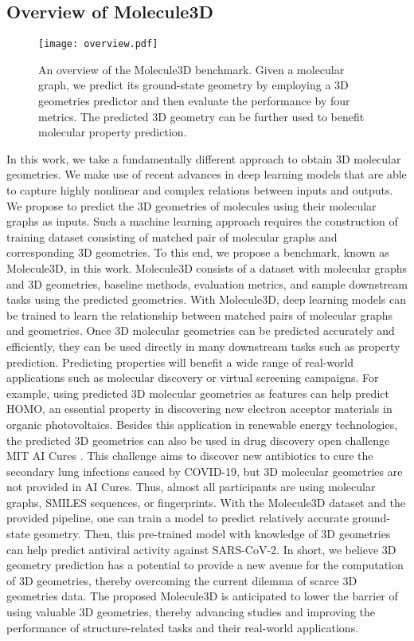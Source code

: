 \documentclass{article}
\begin{document}
\subsection{Overview of Molecule3D}

\begin{figure}
    \centering
    \texttt{[image: overview.pdf]}
    \caption{An overview of the Molecule3D benchmark. Given a molecular graph, we predict its ground-state geometry by employing a 3D geometries predictor and then evaluate the performance by four metrics. The predicted 3D geometry can be further used to benefit molecular property prediction.}
    \label{fig:overview}
\end{figure}

In this work, we take a fundamentally different approach to obtain 3D molecular geometries. We make use of recent advances in deep learning models that are able to capture highly nonlinear and complex relations between inputs and outputs. We propose to predict the 3D geometries of molecules using their molecular graphs as inputs. Such a machine learning approach requires the construction of training dataset consisting of matched pair of molecular graphs and corresponding 3D geometries. To this end, we propose a benchmark, known as Molecule3D, in this work. Molecule3D consists of a dataset with molecular graphs and 3D geometries, baseline methods, evaluation metrics, and sample downstream tasks using the predicted geometries. With Molecule3D, deep learning models can be trained to learn the relationship between matched pairs of molecular graphs and geometries. Once 3D molecular geometries can be predicted accurately and efficiently, they can be used directly in many downstream tasks such as property prediction. Predicting properties will benefit a wide range of real-world applications such as molecular discovery or virtual screening campaigns. For example, using predicted 3D molecular geometries as features can help predict HOMO, an essential property in discovering new electron acceptor materials in organic photovoltaics. Besides this application in renewable energy technologies, the predicted 3D geometries can also be used in drug discovery open challenge MIT AI Cures \cite{aicures}. This challenge aims to discover new antibiotics to cure the secondary lung infections caused by COVID-19, but 3D molecular geometries are not provided in AI Cures. Thus, almost all participants are using molecular graphs, SMILES sequences, or fingerprints. With the Molecule3D dataset and the provided pipeline, one can train a model to predict relatively accurate ground-state geometry.  Then, this pre-trained model with knowledge of 3D geometries can help predict antiviral activity against SARS-CoV-2. In short, we believe 3D geometry prediction has a potential to provide a new avenue for the computation of 3D geometries, thereby overcoming the current dilemma of scarce 3D geometries data. The proposed Molecule3D is anticipated to lower the barrier of using valuable 3D geometries, thereby advancing studies and improving the performance of structure-related tasks and their real-world applications.
\end{document}
